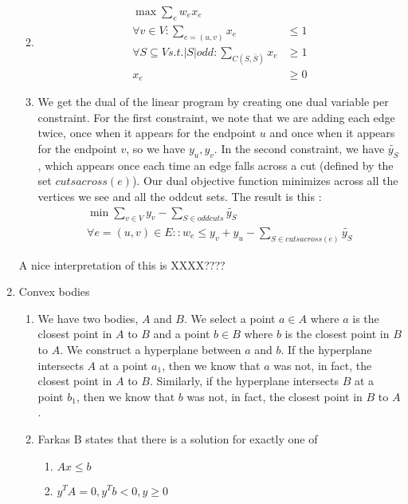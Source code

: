 \documentclass[a4paper]{article}
\begin{document}
\begin{enumerate}
\begin{enumerate}
		\item 
			\begin{align}
				\max \sum_e{w_e x_e}\\
				\forall v \in V : \sum_{e=(u,v)} {x_e} &\leq 1 \\
				 \forall S \subseteq V s.t. \left| {S} \right| odd :
					\sum_{C(S, \overline{S})}{x_e} & \geq 1 \\
				x_e &\geq 0
			\end{align}
		\item We get the dual of the linear program by creating one dual variable per constraint.  For the first constraint, we note that we are adding each edge twice, once when it appears for the endpoint $u$ and once when it appears for the endpoint $v$, so we have $y_u,y_v$.  In the second constraint, we have $\tilde{y_S}$, which appears once each time an edge falls across a cut (defined by the set $cutsacross(e)$).  Our dual objective function minimizes across all the vertices we see and all the oddcut sets.  The result is this :
			\begin{align}
				\min \sum_{v \in V}{y_v} - \sum_{S \in oddcuts}{\tilde{y_S}} \\
				\forall e = (u,v) \in E :: w_e \leq y_v + y_u - \sum_{S \in cutsacross(e)}{\tilde{y_S}}
			\end{align}
	\end{enumerate}
	A nice interpretation of this is XXXX????
\item Convex bodies
	\begin{enumerate}
		\item We have two bodies, $A$ and $B$.  We select a point $a \in A$ where $a$ is the closest point in $A$ to $B$ and a point $b \in B$ where $b$ is the closest point in $B$ to $A$.  We construct a hyperplane between $a$ and $b$.  If the hyperplane intersects $A$ at a point $a_1$, then we know that $a$ was not, in fact, the closest point in $A$ to $B$.  Similarly, if the hyperplane intersects $B$ at a point $b_1$, then we know that $b$ was not, in fact, the closest point in $B$ to $A$.
		\item Farkas B states that there is a solution for exactly one of
			\begin{enumerate}
				\item $Ax \leq b$
				\item $y^TA=0, y^Tb<0, y \geq 0$

\end{enumerate}
\end{enumerate}
\end{enumerate}
\end{document}
